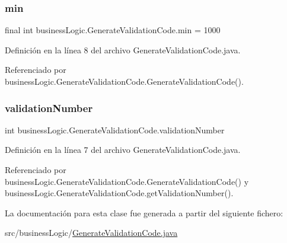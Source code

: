\subsubsection{\texorpdfstring{min}{min}}
{\footnotesize\ttfamily final int business\+Logic.\+Generate\+Validation\+Code.\+min = 1000\hspace{0.3cm}{\ttfamily [private]}}



Definición en la línea 8 del archivo Generate\+Validation\+Code.\+java.



Referenciado por business\+Logic.\+Generate\+Validation\+Code.\+Generate\+Validation\+Code().

\mbox{\label{classbusiness_logic_1_1_generate_validation_code_a070be2bda64238cec0f5951e03cadd07}} 
\subsubsection{\texorpdfstring{validationNumber}{validationNumber}}
{\footnotesize\ttfamily int business\+Logic.\+Generate\+Validation\+Code.\+validation\+Number\hspace{0.3cm}{\ttfamily [private]}}



Definición en la línea 7 del archivo Generate\+Validation\+Code.\+java.



Referenciado por business\+Logic.\+Generate\+Validation\+Code.\+Generate\+Validation\+Code() y business\+Logic.\+Generate\+Validation\+Code.\+get\+Validation\+Number().



La documentación para esta clase fue generada a partir del siguiente fichero\+:\begin{DoxyCompactItemize}
\item 
src/business\+Logic/\mbox{\hyperlink{_generate_validation_code_8java}{Generate\+Validation\+Code.\+java}}\end{DoxyCompactItemize}
